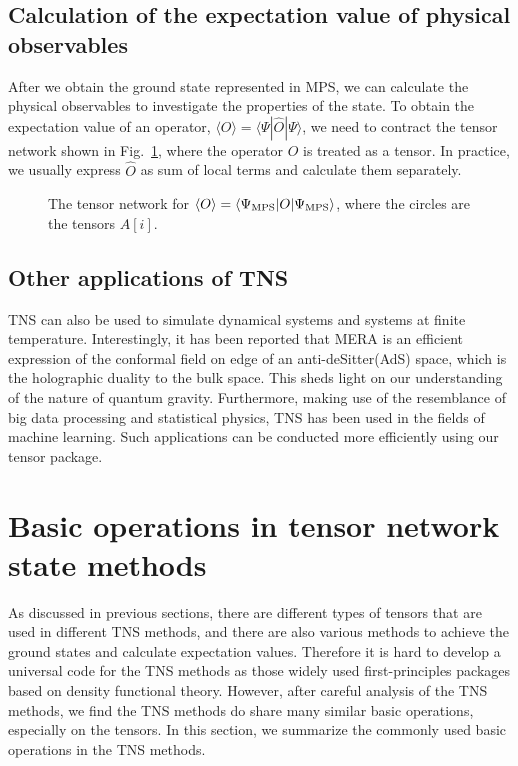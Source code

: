 \documentclass[preprint,3p,times,preprint,showpacs,amsmath,superscriptaddress,floatfix]{elsarticle}
\newcounter{bla}
\begin{document}
\subsection{Calculation of the expectation value of physical observables}

 After we obtain the ground state represented in MPS, we can calculate the physical observables to investigate the properties of the state.
 To obtain the expectation value of an operator, $\langle O\rangle=\langle\Psi|\hat{O}|\Psi\rangle$,
 we need to contract the tensor network shown in Fig.~\ref{Value}, where the operator $O$ is treated as a tensor.
 In practice, we usually express $\hat{O}$ as sum of local terms and calculate them separately.\cite{Schollwoeck2012}
%
\begin{figure} [!hbp]
		\begin{center}
		\caption{The tensor network for $\langle O \rangle =\langle\Psi_{\rm MPS}|O|\Psi_{\rm MPS}\rangle$, where the circles are the tensors $A[i]$.
}\label{Value}
		\end{center}
\end{figure}


\subsection{Other applications of TNS}
	
TNS can also be used to simulate dynamical systems and systems at finite temperature. Interestingly, it has been reported that MERA is an efficient expression of the conformal field on edge of an anti-deSitter(AdS) space\cite{Swingle12}, which is the holographic duality to the bulk space. This sheds light on our understanding of the nature of quantum gravity\cite{Susskind16}. Furthermore, making use of the resemblance of big data processing and statistical physics, TNS has been used in the fields of machine learning\cite{Cichocki14}.
Such applications can be conducted more efficiently using our tensor package.

\section{Basic operations in tensor network state methods}
\label{sec:operations}
	
As discussed in previous sections, there are different types of tensors that are used in different TNS methods, and there are also various methods to achieve the ground states and calculate expectation values. Therefore it is hard to develop a universal code for the TNS methods as those widely used first-principles packages
based on density functional theory. However, after careful analysis of the TNS methods, we find the TNS methods do share many similar basic operations, especially on the tensors. In this section, we summarize the commonly used basic operations in the TNS methods.
\end{document}

